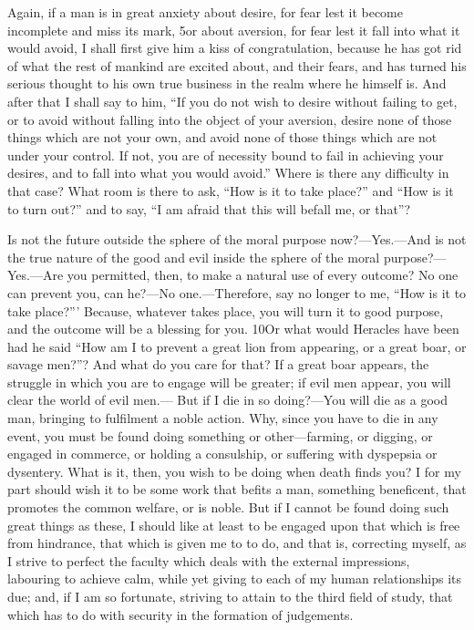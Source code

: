 Again, if a man is in great anxiety about desire, for fear lest it become incomplete and miss its mark, 5or about aversion, for fear lest it fall into what it would avoid, I shall first give him a kiss of congratulation, because he has got rid of what the rest of mankind are excited about, and their fears, and has turned his serious thought to his own true business in the realm where he himself is. And after that I shall say to him, ``If you do not wish to desire without failing to get, or to avoid without falling into the object of your aversion, desire none of those things which are not your own, and avoid none of those things which are not under your control. If not, you are of necessity bound to fail in achieving your desires, and to fall into what you would avoid.'' Where is there any difficulty in that case? What room is there to ask, ``How is it to take place?'' and ``How is it to turn out?'' and to say, ``I am afraid that this will befall me, or that''?

Is not the future outside the sphere of the moral purpose now?—Yes.—And is not the true nature of the good and evil inside the sphere of the moral purpose?—Yes.—Are you permitted, then, to make a natural use of every outcome? No one can prevent you, can he?—No one.—Therefore, say no longer to me, ``How is it to take place?''' Because, whatever takes place, you will turn it to good purpose, and the outcome will be a blessing for you. 10Or what would Heracles have been had he said ``How am I to prevent a great lion from appearing, or a great boar, or savage men?''? And what do you care for that? If a great boar appears, the struggle in which you are to engage will be greater; if evil men appear, you will clear the world of evil men.— But if I die in so doing?—You will die as a good man, bringing to fulfilment a noble action. Why, since you have to die in any event, you must be found doing something or other—farming, or digging, or engaged in commerce, or holding a consulship, or suffering with dyspepsia or dysentery. What is it, then, you wish to be doing when death finds you? I for my part should wish it to be some work that befits a man, something beneficent, that promotes the common welfare, or is noble. But if I cannot be found doing such great things as these, I should like at least to be engaged upon that which is free from hindrance, that which is given me to to do, and that is, correcting myself, as I strive to perfect the faculty which deals with the external impressions, labouring to achieve calm, while yet giving to each of my human relationships its due; and, if I am so fortunate, striving to attain to the third field of study, that which has to do with security in the formation of judgements.

